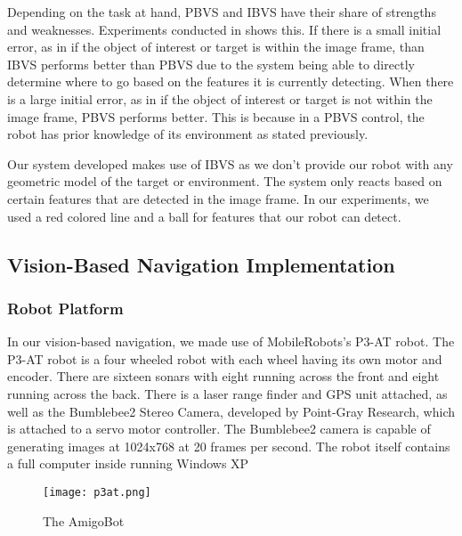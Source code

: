 \documentclass[12pt]{article}
\begin{document}
Depending on the task at hand, PBVS and IBVS have their share of strengths and weaknesses. Experiments conducted in \cite{VisualServoingPathReaching} shows this. If there is a small initial error, as in if the object of interest or target is within the image frame, than IBVS performs better than PBVS due to the system being able to directly determine where to go based on the features it is currently detecting. When there is a large initial error, as in if the object of interest or target is not within the image frame, PBVS performs better. This is because in a PBVS control, the robot has prior knowledge of its environment as stated previously. 

Our system developed makes use of IBVS as we don't provide our robot with any geometric model of the target or environment. The system only reacts based on certain features that are detected in the image frame. In our experiments, we used a red colored line and a ball for features that our robot can detect.

\subsection{Vision-Based Navigation Implementation} \label{sec:visioncontrol}
 

\subsubsection{Robot Platform}
In our vision-based navigation, we made use of MobileRobots's P3-AT robot. The P3-AT robot is a four wheeled robot with each wheel having its own motor and encoder. There are sixteen sonars with eight running across the front and eight running across the back. There is a laser range finder and GPS unit attached, as well as the Bumblebee2 Stereo Camera, developed by Point-Gray Research, which is attached to a servo motor controller. The Bumblebee2 camera is capable of generating images at 1024x768 at 20 frames per second.  The robot itself contains a full computer inside running Windows XP

\begin{figure}[htp!]
	\begin{center}
		\texttt{[image: p3at.png]}
		\caption{The AmigoBot} \label{fig.p3at}
	\end{center}
\end{figure}
\end{document}
